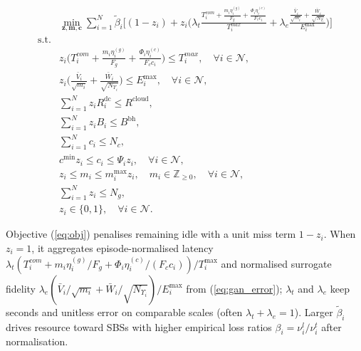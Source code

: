 \documentclass[letterpaper%
, twoside%
, 12pt%
,memoire%
, english%
,creativecommons,hyperref, withAlgo2e %
]{thETS}
\numberwithin{algorithm}{chapter}
\begin{document}
\begin{subequations} \label{eq:subeqnsss}
\begin{align}
& \min_{\mathbf{z}, \mathbf{m}, \mathbf{c}} \sum_{i=1}^{N}\tilde{\beta}_i\Big[(1-z_i) + z_i\Big(\lambda_t\frac{T_i^{com}+\frac{m_i\eta_i^{(g)}}{F_g}+\frac{\Phi_i\eta_i^{(c)}}{F_c c_i}}{T_i^{max}}+\lambda_e\frac{\frac{\bar{V}_i}{\sqrt{m_i}}+\frac{\bar{W}_i}{\sqrt{N_{\Upsilon_i}}}}{E_i^{\max}}\Big)\Big] \label{eq:obj} \\
\text{s.t.} & \nonumber \\
& z_i\Big(T_i^{com}+\frac{m_i\eta_i^{(g)}}{F_g}+\frac{\Phi_i\eta_i^{(c)}}{F_c c_i}\Big)\leq T_i^{max}, \quad \forall i\in\mathcal{N}, \label{eq:time}\\
& z_i\Big(\frac{\bar{V}_i}{\sqrt{m_i}}+\frac{\bar{W}_i}{\sqrt{N_{\Upsilon_i}}}\Big)\leq E_i^{\max},\quad \forall i\in\mathcal{N}, \label{eq:error}\\
& \sum_{i=1}^{N} z_i R_i^{\mathrm{dc}} \leq R^{\mathrm{cloud}}, \label{eq:R_all} \\
& \sum_{i=1}^{N} z_i B_i \leq B^{\mathrm{bh}}, \label{eq:bw_all} \\
& \sum_{i=1}^{N} c_i \leq N_c, \label{eq:sum_cpus} \\
& c^{\min} z_i \leq c_i \leq \Psi_i z_i ,\quad \forall i\in\mathcal{N}, \label{eq:c_limits} \\
& z_i\leq m_i \leq m_i^{\max} z_i ,\quad m_i\in\mathbb{Z}_{\geq 0},\quad \forall i\in\mathcal{N}, \label{eq:m_bounds}\\
& \sum_{i=1}^{N}{z_i} \leq N_g, \label{eq:sum_gpus} \\
& z_i \in \{0,1\}, \quad \forall i\in\mathcal{N}. \label{eq:binary_z}
\end{align}
\end{subequations}



Objective (\ref{eq:obj}) penalises remaining idle with a unit miss term \(1-z_i\). When \(z_i=1\), it aggregates episode-normalised latency \(\lambda_t(T_i^{com}+m_i\eta_i^{(g)}/F_g+\Phi_i\eta_i^{(c)}/(F_cc_i))/T_i^{\max}\) and normalised surrogate fidelity \(\lambda_e(\bar{V}_i/\sqrt{m_i}+\bar{W}_i/\sqrt{N_{\Upsilon_i}})/E_i^{\max}\) from (\ref{eq:gan_error}); \(\lambda_t\) and \(\lambda_e\) keep seconds and unitless error on comparable scales (often \(\lambda_t+\lambda_e=1\)). Larger \(\tilde{\beta}_i\) drives resource toward SBSs with higher empirical loss ratios \(\beta_i=\nu_i^l/\nu_i^t\) after normalisation.
\end{document}
